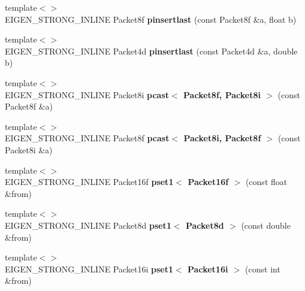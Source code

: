 \begin{DoxyCompactItemize}
\mbox{\label{namespace_eigen_1_1internal_a664c45bfc9e2f141d98d7ea96ca2425e}} 
{\footnotesize template$<$$>$ }\\E\+I\+G\+E\+N\+\_\+\+S\+T\+R\+O\+N\+G\+\_\+\+I\+N\+L\+I\+NE Packet8f {\bfseries pinsertlast} (const Packet8f \&a, float b)
\item 
\mbox{\label{namespace_eigen_1_1internal_a1d47d94a58c112440594fc167306538c}} 
{\footnotesize template$<$$>$ }\\E\+I\+G\+E\+N\+\_\+\+S\+T\+R\+O\+N\+G\+\_\+\+I\+N\+L\+I\+NE Packet4d {\bfseries pinsertlast} (const Packet4d \&a, double b)
\item 
\mbox{\label{namespace_eigen_1_1internal_ad65b4d3d9a7b519ba0cc5cdcbc07b579}} 
{\footnotesize template$<$$>$ }\\E\+I\+G\+E\+N\+\_\+\+S\+T\+R\+O\+N\+G\+\_\+\+I\+N\+L\+I\+NE Packet8i {\bfseries pcast$<$ Packet8f, Packet8i $>$} (const Packet8f \&a)
\item 
\mbox{\label{namespace_eigen_1_1internal_a125a89ba45ea3fa5607e19c8e6a99164}} 
{\footnotesize template$<$$>$ }\\E\+I\+G\+E\+N\+\_\+\+S\+T\+R\+O\+N\+G\+\_\+\+I\+N\+L\+I\+NE Packet8f {\bfseries pcast$<$ Packet8i, Packet8f $>$} (const Packet8i \&a)
\item 
\mbox{\label{namespace_eigen_1_1internal_a752f8ffbc42dd0f4f60ad31325ad8d8b}} 
{\footnotesize template$<$$>$ }\\E\+I\+G\+E\+N\+\_\+\+S\+T\+R\+O\+N\+G\+\_\+\+I\+N\+L\+I\+NE Packet16f {\bfseries pset1$<$ Packet16f $>$} (const float \&from)
\item 
\mbox{\label{namespace_eigen_1_1internal_ad54ae092bed1e6a1c17d6bec21e8178c}} 
{\footnotesize template$<$$>$ }\\E\+I\+G\+E\+N\+\_\+\+S\+T\+R\+O\+N\+G\+\_\+\+I\+N\+L\+I\+NE Packet8d {\bfseries pset1$<$ Packet8d $>$} (const double \&from)
\item 
\mbox{\label{namespace_eigen_1_1internal_a34956597a29e322dc0c92087ef76518e}} 
{\footnotesize template$<$$>$ }\\E\+I\+G\+E\+N\+\_\+\+S\+T\+R\+O\+N\+G\+\_\+\+I\+N\+L\+I\+NE Packet16i {\bfseries pset1$<$ Packet16i $>$} (const int \&from)

\end{DoxyCompactItemize}
